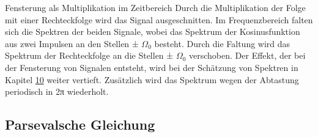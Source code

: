 \begin{example}{Fensterung als Multiplikation im Zeitbereich}
Durch die Multiplikation der Folge mit einer Rechteckfolge wird das Signal ausgeschnitten. Im Frequenzbereich falten sich die Spektren der beiden Signale, wobei das Spektrum der Kosinusfunktion aus zwei Impulsen an den Stellen ± \(Ω_{0}\) besteht. Durch die Faltung wird das Spektrum der Rechteckfolge an die Stellen ± \(Ω_{0}\) verschoben. Der Effekt, der bei der Fensterung von Signalen entsteht, wird bei der Schätzung von Spektren in Kapitel \hyperref[diskrete-fourier-transformation]{10} weiter vertieft. Zusätzlich wird das Spektrum wegen der Abtastung periodisch in 2π wiederholt.

\end{example}

\subsection{Parsevalsche Gleichung}\label{sec:parsevalsche-gleichung}

